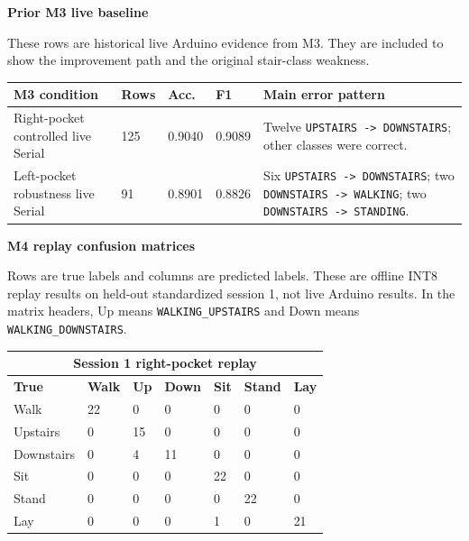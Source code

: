 \documentclass[11pt,a4paper]{article}
\begin{document}
\textbf{Prior M3 live baseline}

These rows are historical live Arduino evidence from M3. They are included to show the improvement path and the original stair-class weakness.

\begin{center}
\small
\begin{tabular}{|p{3.6cm}|p{0.9cm}|p{1.1cm}|p{1.1cm}|p{6.1cm}|}
\hline
\rowcolor{headergray}
\textbf{M3 condition} & \textbf{Rows} & \textbf{Acc.} & \textbf{F1} & \textbf{Main error pattern}\\
\hline
Right-pocket controlled live Serial & 125 & 0.9040 & 0.9089 & Twelve \texttt{UPSTAIRS -> DOWNSTAIRS}; other classes were correct.\\
\hline
Left-pocket robustness live Serial & 91 & 0.8901 & 0.8826 & Six \texttt{UPSTAIRS -> DOWNSTAIRS}; two \texttt{DOWNSTAIRS -> WALKING}; two \texttt{DOWNSTAIRS -> STANDING}.\\
\hline
\end{tabular}
\end{center}
\normalsize

\textbf{M4 replay confusion matrices}

Rows are true labels and columns are predicted labels. These are offline INT8 replay results on held-out standardized session 1, not live Arduino results.
In the matrix headers, Up means \texttt{WALKING\_UPSTAIRS} and Down means \texttt{WALKING\_DOWNSTAIRS}.

\begin{center}
\scriptsize
\begin{tabular}{|p{2.2cm}|p{1.0cm}|p{1.0cm}|p{1.0cm}|p{1.0cm}|p{1.0cm}|p{1.0cm}|}
\hline
\multicolumn{7}{|c|}{\cellcolor{headergray}\textbf{Session 1 right-pocket replay}}\\
\hline
\rowcolor{headergray}
\textbf{True} & \textbf{Walk} & \textbf{Up} & \textbf{Down} & \textbf{Sit} & \textbf{Stand} & \textbf{Lay}\\
\hline
Walk & 22 & 0 & 0 & 0 & 0 & 0\\
\hline
Upstairs & 0 & 15 & 0 & 0 & 0 & 0\\
\hline
Downstairs & 0 & 4 & 11 & 0 & 0 & 0\\
\hline
Sit & 0 & 0 & 0 & 22 & 0 & 0\\
\hline
Stand & 0 & 0 & 0 & 0 & 22 & 0\\
\hline
Lay & 0 & 0 & 0 & 1 & 0 & 21\\
\hline
\end{tabular}
\end{center}
\normalsize
\end{document}
